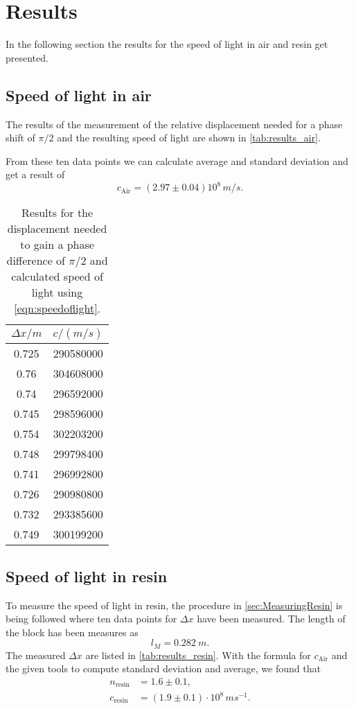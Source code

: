 \section{Results}
\label{sec:results}
In the following section the results for the speed of light in air and resin get presented.

\subsection{Speed of light in air}
\label{sec:results:Air}
The results of the measurement of the relative displacement needed for a phase shift of $\pi / 2$ and
the resulting speed of light are shown in \autoref{tab:results_air}.

From these ten data points we can calculate average and standard deviation and get a result of
\begin{equation}
  c_\text{Air} = (2.97 \pm 0.04) 10^8 \, \si{m/s}.
\end{equation}

\begin{table}
  \centering
  \caption{Results for the displacement needed to gain a phase difference of $\pi/2$ and
  calculated speed of light using \autoref{eqn:speedoflight}.}
  \label{tab:results_air}
  \begin{tabular}{c | c}
    $\Delta x / \si{m}$ & $c / (\si{m/s})$\\
    \hline
    0.725 & 290580000\\
    0.76  & 304608000\\
    0.74  & 296592000\\
    0.745 & 298596000\\
    0.754 & 302203200\\
    0.748 & 299798400\\
    0.741 & 296992800\\
    0.726 & 290980800\\
    0.732 & 293385600\\
    0.749 & 300199200\\
  \end{tabular}
\end{table}

\subsection{Speed of light in resin}
\label{sec:results:Resin}
To measure the speed of light in resin, the procedure in \autoref{sec:MeasuringResin} is being
followed where ten data points for $\Delta x$ have been measured. The length of the block has been
measures as
\begin{equation}
  l_M = \SI{0.282}{m}.
\end{equation}
The measured $\Delta x$ are listed in \autoref{tab:results_resin}. With the formula for
$c_\text{Air}$ and the given tools to compute standard deviation and average, we found that
\begin{align}
  n_\text{resin} &= 1.6 \pm 0.1, \\
  c_\text{resin} &= (1.9 \pm 0.1) \cdot 10^8 \, \si{ms^{-1}}.
\end{align}

